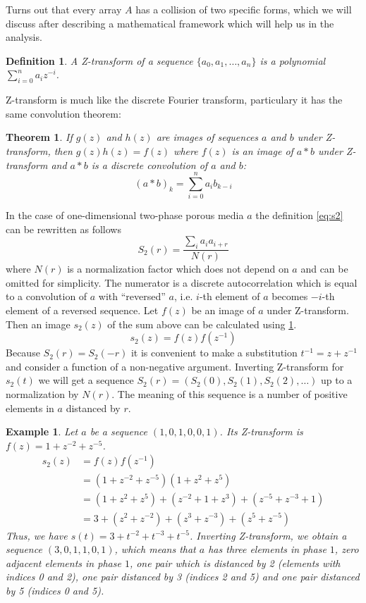 \documentclass[12pt, a4paper]{article}
\newtheorem{definition}{Definition}
\newtheorem{example}{Example}
\newtheorem{theorem}{Theorem}
\begin{document}
Turns out that every array $A$ has a collision of two specific forms, which we
will discuss after describing a mathematical framework which will help us in the
analysis.

\begin{definition}
  A Z-transform of a sequence $\{a_0, a_1, \dots, a_n\}$ is a polynomial
  $\sum_{i=0}^n a_i z^{-i}$.
\end{definition}
Z-transform is much like the discrete Fourier transform, particulary it has the
same convolution theorem:
\begin{theorem}
  If $g(z)$ and $h(z)$ are images of sequences $a$ and $b$ under Z-transform,
  then $g(z)h(z) = f(z)$ where $f(z)$ is an image of $a*b$ under Z-transform
  and $a*b$ is a discrete convolution of $a$ and $b$:
  \begin{equation*}
    (a*b)_k = \sum_{i=0}^{n} a_i b_{k-i}
  \end{equation*}
  \label{th:conv}
\end{theorem}
In the case of one-dimensional two-phase porous media $a$ the definition
\ref{eq:s2} can be rewritten as follows
\begin{equation*}
  S_2(r) = \frac{\sum_{i}a_ia_{i+r}}{N(r)}
\end{equation*}
where $N(r)$ is a normalization factor which does not depend on $a$ and can be
omitted for simplicity. The numerator is a discrete autocorrelation which is
equal to a convolution of $a$ with ``reversed'' $a$, i.e. $i$-th element of $a$
becomes $-i$-th element of a reversed sequence. Let $f(z)$ be an image of $a$
under Z-transform. Then an image $s_2(z)$ of the sum above can be calculated
using \cref{th:conv}.
\begin{equation}
  s_2(z) = f(z)f(z^{-1})
  \label{eq:s2z}
\end{equation}
Because $S_2(r) = S_2(-r)$ it is convenient to make a substitution $t^{-1} = z +
z^{-1}$ and consider a function of a non-negative argument. Inverting
Z-transform for $s_2(t)$ we will get a sequence
$S_2(r) = (S_2(0), S_2(1), S_2(2), \dots)$ up to a normalization by $N(r)$. The
meaning of this sequence is a number of positive elements in $a$ distanced by
$r$.
\begin{example}
  Let $a$ be a sequence $(1, 0, 1, 0, 0, 1)$. Its Z-transform is
  $f(z) = 1 + z^{-2} + z^{-5}$.
  \begin{align*}
    s_2(z) &= f(z)f(z^{-1}) \\
    &= (1 + z^{-2} + z^{-5})(1 + z^2 + z^5) \\
    &= (1 + z^2 + z^5) + (z^{-2} + 1 + z^3) + (z^{-5} + z^{-3} + 1) \\
    &= 3 + (z^2 + z^{-2}) + (z^3 + z^{-3}) + (z^5 + z^{-5})
  \end{align*}
  Thus, we have $s(t) = 3 + t^{-2} + t^{-3} + t^{-5}$. Inverting Z-transform, we
  obtain a sequence $(3, 0, 1, 1, 0, 1)$, which means that $a$ has three
  elements in phase $1$, zero adjacent elements in phase $1$, one pair which is
  distanced by 2 (elements with indices 0 and 2), one pair distanced by 3
  (indices 2 and 5) and one pair distanced by 5 (indices 0 and 5).
\end{example}
\end{document}
